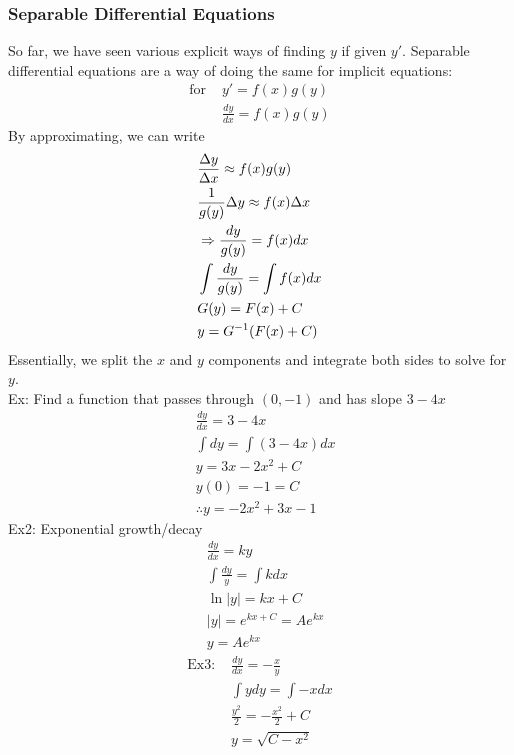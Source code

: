 \documentclass[11pt, fleqn]{article}
\begin{document}
\subsubsection{Separable Differential Equations}
So far, we have seen various explicit ways of finding $y$ if given $y'$. Separable differential equations are a way of doing the same for implicit equations:
\begin{align*}
    \text{for }&y'=f(x)g(y)\\
    &\frac{dy}{dx}=f(x)g(y)
\end{align*}
By approximating, we can write
\begin{align*}
    &\frac{\Delta y}{\Delta x}\approx f(x)g(y)\\
    &\frac{1}{g(y)}\Delta y\approx f(x)\Delta x\\
    &\Rightarrow \frac{dy}{g(y)}=f(x)dx\\
    &\int \frac{dy}{g(y)}=\int f(x)dx\\
    &G(y)=F(x)+C\\
    &y=G^{-1}(F(x)+C)
\end{align*}
Essentially, we split the $x$ and $y$ components and integrate both sides to solve for $y$.\\
Ex: Find a function that passes through $(0,-1)$ and has slope $3-4x$
\begin{align*}
    &\frac{dy}{dx}=3-4x\\
    &\int dy=\int(3-4x)dx\\
    &y=3x-2x^2+C\\
    &y(0)=-1=C\\
    &\therefore y=-2x^2+3x-1
\end{align*}
Ex2: Exponential growth/decay
\begin{align*}
    &\frac{dy}{dx}=ky\\
    &\int\frac{dy}{y}=\int kdx\\
    &\ln|y|=kx+C\\
    &|y|=e^{kx+C}=Ae^{kx}\\
    &y=Ae^{kx}
\end{align*}
\begin{align*}
    \text{Ex3: }&\frac{dy}{dx}=-\frac{x}{y}\\
    &\int ydy=\int -xdx\\
    &\frac{y^2}{2}=-\frac{x^2}{2}+C\\
    &y=\sqrt{C-x^2}
\end{align*}
\end{document}
